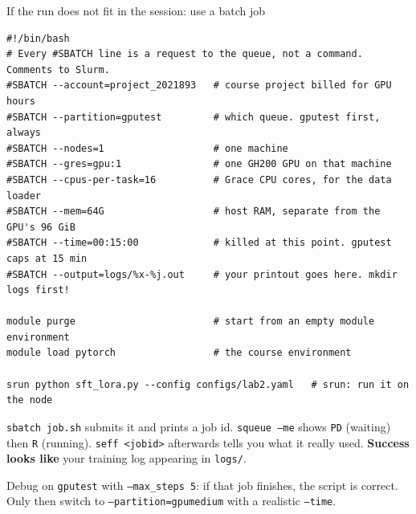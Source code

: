 \documentclass[aspectratio=169,10pt]{beamer}
\begin{document}
\iffalse
\begin{frame}[fragile,shrink=12]{If the run does not fit in the session: use a batch job}
\begin{lstlisting}[language=slurm]
#!/bin/bash
# Every #SBATCH line is a request to the queue, not a command. Comments to Slurm.
#SBATCH --account=project_2021893   # course project billed for GPU hours
#SBATCH --partition=gputest         # which queue. gputest first, always
#SBATCH --nodes=1                   # one machine
#SBATCH --gres=gpu:1                # one GH200 GPU on that machine
#SBATCH --cpus-per-task=16          # Grace CPU cores, for the data loader
#SBATCH --mem=64G                   # host RAM, separate from the GPU's 96 GiB
#SBATCH --time=00:15:00             # killed at this point. gputest caps at 15 min
#SBATCH --output=logs/%x-%j.out     # your printout goes here. mkdir logs first!

module purge                        # start from an empty module environment
module load pytorch                 # the course environment

srun python sft_lora.py --config configs/lab2.yaml   # srun: run it on the node
\end{lstlisting}
  \vspace{0.2em}
  \small
  \texttt{sbatch job.sh} submits it and prints a job id. \quad
  \texttt{squeue --me} shows \texttt{PD} (waiting) then \texttt{R} (running).
  \quad \texttt{seff <jobid>} afterwards tells you what it really used.
  \textbf{Success looks like} your training log appearing in \texttt{logs/}.
  \vspace{0.2em}

  Debug on \texttt{gputest} with \texttt{--max\_steps 5}: if that job finishes,
  the script is correct. Only then switch to \texttt{--partition=gpumedium}
  with a realistic \texttt{--time}.
\end{frame}
\end{document}
